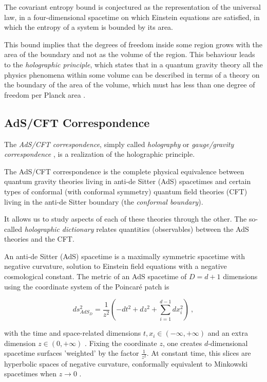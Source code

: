 \documentclass[twocolumn]{revtex4}
\providecommand{\eq}[2]{
    \begin{equation}
        #2
    \label{eq:#1}
    \end{equation}
}
\begin{document}
The covariant entropy bound \cite{bousso_covariant_1999} is conjectured as the representation of the universal law, in a four-dimensional spacetime on which Einstein equations are satisfied, in which the entropy of a system is bounded by its area.

This bound implies that the degrees of freedom inside some region grows with the area of the boundary and not as the volume of the region. This behaviour leads to the \textit{holographic principle}, which states that in a quantum gravity theory all the physics phenomena within some volume can be described in terms of a theory on the boundary of the area of the volume, which must has less than one degree of freedom per Planck area \cite{t_hooft_dimensional_2009}.


\subsection{AdS/CFT Correspondence} \label{ss:AdS/CFT}

The \textit{AdS/CFT correspondence}, simply called \textit{holography} or \textit{gauge/gravity correspondence} \cite{ramallo_introduction_2013}, is a realization of the holographic principle.

The AdS/CFT correspondence is the complete physical equivalence between quantum gravity theories living in anti-de Sitter (AdS) spacetimes and certain types of conformal (with conformal symmetry) quantum field theories (CFT) living in the anti-de Sitter boundary (the \textit{conformal boundary}).

It allows us to study aspects of each of these theories through the other. The so-called \textit{holographic dictionary} relates quantities (observables) between the AdS theories and the CFT. %

An anti-de Sitter (AdS) spacetime is a maximally symmetric spacetime with negative curvature, solution to Einstein field equations with a negative cosmological constant. The metric of an AdS spacetime of $D=d+1$ dimensions using the coordinate system of the Poincaré patch is
\eq{AdS_PP-metric}{
    ds_{AdS_D}^2 = \frac{1}{z^2} \left( -dt^2 + dz^2 + \sum_{i=1}^{d-1} dx_i^2 \right) \ ,
}
with the time and space-related dimensions $t , x_i \in (-\infty,+\infty)$ and an extra dimension $z \in (0,+\infty)$ \cite{kaplan_lectures_nodate}. Fixing the coordinate $z$, one creates $d$-dimensional spacetime surfaces 'weighted' by the factor $\frac{1}{z^2}$. At constant time, this slices are hyperbolic spaces of negative curvature, conformally equivalent to Minkowski spacetimes when $z \to 0$ \cite{}.
\end{document}
